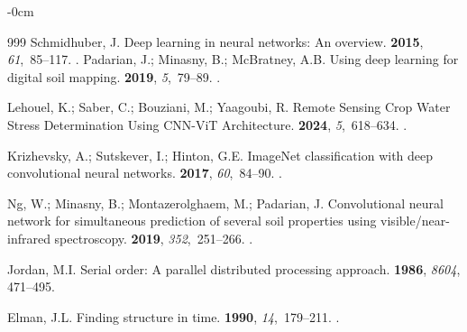 \documentclass[land,review,accept,pdftex,oneauthor]{Definitions/mdpi}
\begin{document}
\begin{adjustwidth}{-\extralength}{0cm}
\begin{thebibliography}{999}
Schmidhuber, J.
\newblock Deep learning in neural networks: An overview.
 {\bf 2015}, {\em 61},~85--117.
.
Padarian, J.; Minasny, B.; McBratney, A.B.
\newblock Using deep learning for digital soil mapping. %
 {\bf 2019}, {\em 5},~79--89.
.

Lehouel, K.; Saber, C.; Bouziani, M.; Yaagoubi, R.
\newblock Remote Sensing Crop Water Stress Determination Using CNN-ViT
  Architecture.
 {\bf 2024}, {\em 5},~618--634.
.

Krizhevsky, A.; Sutskever, I.; Hinton, G.E.
\newblock ImageNet classification with deep convolutional neural networks.
 {\bf 2017}, {\em 60},~84–90.
.

Ng, W.; Minasny, B.; Montazerolghaem, M.; Padarian, J.
\newblock Convolutional neural network for simultaneous prediction of several
  soil properties using visible/near-infrared spectroscopy.
 {\bf 2019}, {\em 352},~251--266.
.

Jordan, M.I.
\newblock Serial order: A parallel distributed processing approach.
 {\bf 1986}, {\em 8604}, 471--495.

Elman, J.L.
\newblock Finding structure in time.
 {\bf 1990}, {\em 14},~179--211.
.


\end{thebibliography}
\end{adjustwidth}
\end{document}
